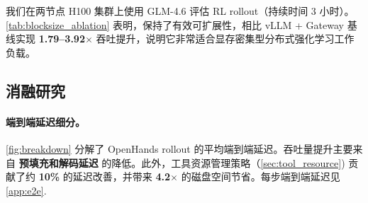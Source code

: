 我们在两节点 H100 集群上使用 GLM-4.6 评估 RL rollout（持续时间 3 小时）。\autoref{tab:blocksize_ablation} 表明，\ouralg 保持了有效可扩展性，相比 vLLM + Gateway 基线实现 \textbf{1.79--3.92$\times$} 吞吐提升，说明它非常适合显存密集型分布式强化学习工作负载。

\vspace{-2mm}
\subsection{消融研究}\label{app:ablation_study}
\paragraph{端到端延迟细分。}
\autoref{fig:breakdown} 分解了 OpenHands rollout 的平均端到端延迟。吞吐量提升主要来自 \textbf{预填充和解码延迟} 的降低。此外，工具资源管理策略（\autoref{sec:tool_resource}) 贡献了约 \textbf{10\%} 的延迟改善，并带来 \textbf{4.2$\times$} 的磁盘空间节省。每步端到端延迟见 \autoref{app:e2e}.

